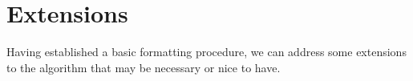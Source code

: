 \section{Extensions}

Having established a basic formatting procedure,
we can address some extensions to the algorithm that may be necessary or nice to have.



